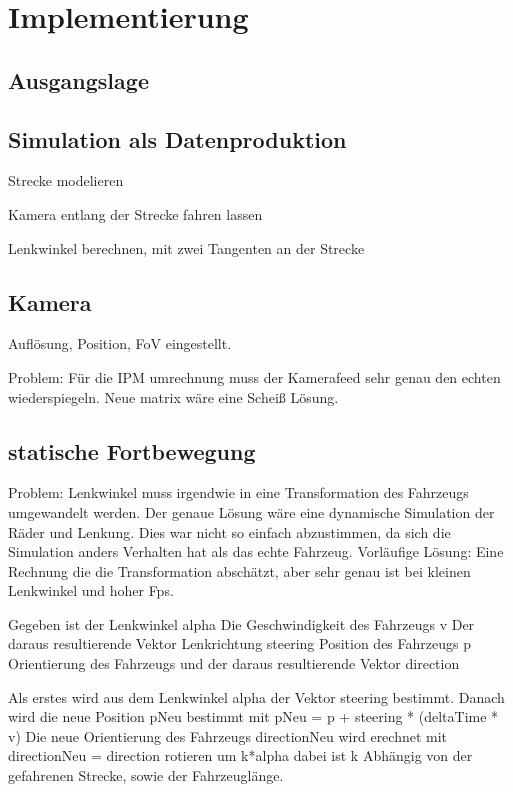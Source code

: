 
\chapter{Implementierung}

\section{Ausgangslage}

\section{Simulation als Datenproduktion}
Strecke modelieren

Kamera entlang der Strecke fahren lassen

Lenkwinkel berechnen, mit zwei Tangenten an der Strecke


\section{Kamera}
Auflösung, Position, FoV eingestellt.

Problem: Für die IPM umrechnung muss der Kamerafeed sehr genau den echten wiederspiegeln.
Neue matrix wäre eine Scheiß Lösung.


\section{statische Fortbewegung}
Problem: Lenkwinkel muss irgendwie in eine Transformation des Fahrzeugs umgewandelt werden.
Der genaue Lösung wäre eine dynamische Simulation der Räder und Lenkung.
Dies war nicht so einfach abzustimmen, da sich die Simulation anders Verhalten hat als das echte Fahrzeug.
Vorläufige Lösung: Eine Rechnung die die Transformation abschätzt, aber sehr genau ist bei kleinen Lenkwinkel und hoher Fps.

Gegeben ist der Lenkwinkel alpha
Die Geschwindigkeit des Fahrzeugs v
Der daraus resultierende Vektor Lenkrichtung steering
Position des Fahrzeugs p
Orientierung des Fahrzeugs und der daraus resultierende Vektor direction

Als erstes wird aus dem Lenkwinkel alpha der Vektor steering bestimmt.
Danach wird die neue Position pNeu bestimmt mit pNeu = p + steering * (deltaTime * v)
Die neue Orientierung des Fahrzeugs directionNeu wird erechnet mit directionNeu = direction rotieren um k*alpha
dabei ist k Abhängig von der gefahrenen Strecke, sowie der Fahrzeuglänge.

